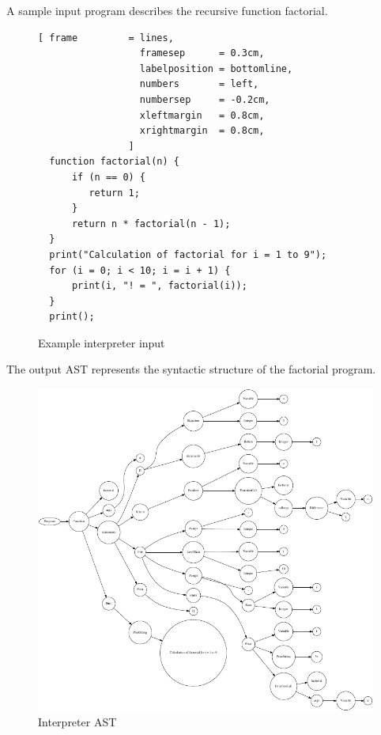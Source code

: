 A sample input program  describes the recursive function factorial.
\begin{figure}[!ht]

\begin{Verbatim}[ frame         = lines, 
                  framesep      = 0.3cm, 
                  labelposition = bottomline,
                  numbers       = left,
                  numbersep     = -0.2cm,
                  xleftmargin   = 0.8cm,
                  xrightmargin  = 0.8cm,
                ]
  function factorial(n) {
      if (n == 0) {
         return 1;
      }
      return n * factorial(n - 1);
  }
  print("Calculation of factorial for i = 1 to 9");
  for (i = 0; i < 10; i = i + 1) {
      print(i, "! = ", factorial(i));
  }
  print();
		\end{Verbatim}
\caption{Example interpreter input}
\label{fig:example_interpreter_input}
\end{figure}
%
The output AST  represents the syntactic structure of the factorial program. 
%


\begin{figure}
	\centering
		\includegraphics{interpreter_tree.pdf}
	\caption{Interpreter AST}
	\label{fig:interpreter_tree}
\end{figure}

